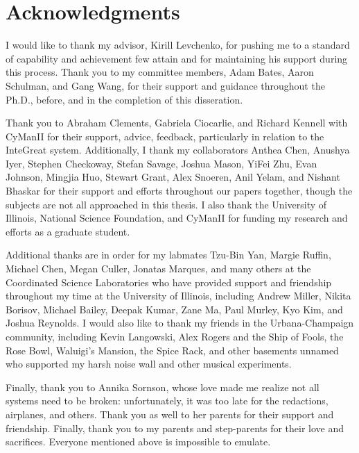 \chapter*{Acknowledgments}

I would like to thank my advisor, Kirill Levchenko, for pushing me to a standard of capability and achievement few attain and for maintaining his support during this process.
Thank you to my committee members, Adam Bates, Aaron Schulman, and Gang Wang, for their support and guidance throughout the Ph.D., before, and in the completion of this disseration.

Thank you to Abraham Clements, Gabriela Ciocarlie, and Richard Kennell with CyManII for their support, advice, feedback, particularly in relation to the InteGreat system.
Additionally, I thank my collaborators Anthea Chen, Anushya Iyer, Stephen Checkoway, Stefan Savage, Joshua Mason, YiFei Zhu, Evan Johnson, Mingjia Huo, Stewart Grant, Alex Snoeren, Anil Yelam, and Nishant Bhaskar for their support and efforts throughout our papers together, though the subjects are not all approached in this thesis.
I also thank the University of Illinois, National Science Foundation, and CyManII for funding my research and efforts as a graduate student.

Additional thanks are in order for my labmates Tzu-Bin Yan, Margie Ruffin, Michael Chen, Megan Culler, Jonatas Marques, and many others at the Coordinated Science Laboratories who have provided support and friendship throughout my time at the University of Illinois, including Andrew Miller, Nikita Borisov, Michael Bailey, Deepak Kumar, Zane Ma, Paul Murley, Kyo Kim, and Joshua Reynolds.
I would also like to thank my friends in the Urbana-Champaign community, including Kevin Langowski, Alex Rogers and the Ship of Fools, the Rose Bowl, Waluigi's Mansion, the Spice Rack, and other basements unnamed who supported my harsh noise wall and other musical experiments.

Finally, thank you to Annika Sornson, whose love made me realize not all systems need to be broken: unfortunately, it was too late for the redactions, airplanes, and others.
Thank you as well to her parents for their support and friendship.
Finally, thank you to my parents and step-parents for their love and sacrifices.
Everyone mentioned above is impossible to emulate.
